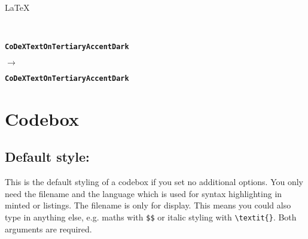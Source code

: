 \documentclass{article}
\begin{document}
\noindent
\begin{minipage}[t]{\textwidth}
    \begin{cdxcodebox}[showfile=false, showlanguage=false, codebgcolor=CoDeXExtraLight, languagebgcolor=CoDeXLight, languagetextcolor=CoDeXTextOnLight, codestyle=light, breakable=false]{ }{LaTeX}
\usepackage[textontertiaryaccentdark=59ABFF]{CoDeX}
    \end{cdxcodebox}
\end{minipage}%
\vspace{-4.55mm}\\
\begin{minipage}[t]{0.47\textwidth}
    \begin{cdxtextbox}[showtitle=false, bodybgcolor=CoDeXTextOnTertiaryAccentDark, bodytextcolor=CoDeXTextOnLight, bodyborder=solid, bodybordercolor=CoDeXExtraLight]
        \small\textbf{\texttt{CoDeXTextOnTertiaryAccentDark}}
    \end{cdxtextbox}
\end{minipage}
\hfill
\begin{minipage}[c]{0.04\textwidth}
    \centering
    \vspace{10.0mm}
    \large\texttt{$\rightarrow$}
\end{minipage}
\hfill
\begin{minipage}[t]{0.47\textwidth}
    \begin{cdxtextbox}[showtitle=false, bodybgcolor=CoDeXAccentTertiary, bodytextcolor=CoDeXTextOnTertiaryAccent]
        \small\textbf{\texttt{CoDeXTextOnTertiaryAccentDark}}
    \end{cdxtextbox}
\end{minipage}%

\newpage

\section*{Codebox}

\subsection*{Default style:}

This is the default styling of a codebox if you set no additional options. You only need the filename and the language which is used for syntax highlighting in minted or listings. The filename is only for display. This means you could also type in anything else, e.g. maths with \texttt{\$\$} or italic styling with \texttt{\textbackslash textit\{\}}. Both arguments are required.
\end{document}
